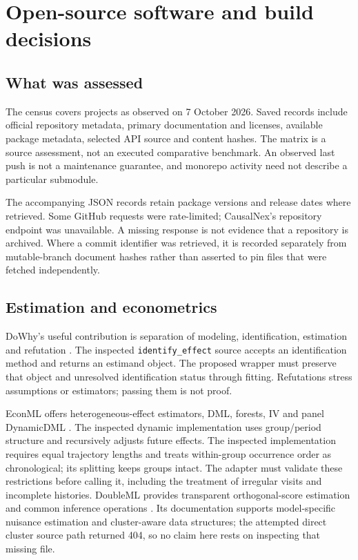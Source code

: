 \chapter{Open-source software and build decisions}\label{ch:software}
\section{What was assessed}
The census covers \SoftwareCount{} projects as observed on 7 October 2026. Saved records
include official repository metadata, primary documentation and licenses,
available package metadata, selected API source and content hashes.
The matrix is a source assessment, not an executed comparative benchmark.
An observed last push is not a maintenance guarantee, and monorepo activity
need not describe a particular submodule.

The accompanying JSON records retain package versions and release dates
where retrieved. Some GitHub requests were rate-limited; CausalNex's
repository endpoint was unavailable. A missing response is not evidence
that a repository is archived. Where a commit identifier was retrieved,
it is recorded separately from mutable-branch document hashes rather than
asserted to pin files that were fetched independently.

\section{Estimation and econometrics}
DoWhy's useful contribution is separation of modeling, identification,
estimation and refutation \citep{dowhy2020,sw_dowhy}.
The inspected \texttt{identify\_effect} source accepts an identification
method and returns an estimand object. The proposed wrapper must preserve
that object and unresolved identification status through fitting.
Refutations stress assumptions or estimators; passing them is not proof.

EconML offers heterogeneous-effect estimators, DML, forests, IV and
panel DynamicDML \citep{sw_econml}. The inspected dynamic implementation
uses group/period structure and recursively adjusts future effects.
The inspected implementation requires equal trajectory lengths and treats
within-group occurrence order as chronological; its splitting keeps groups
intact. The adapter must validate these restrictions before calling it,
including the treatment of irregular visits and incomplete histories.
DoubleML provides transparent orthogonal-score estimation and common
inference operations \citep{doubleml2022,sw_doubleml}. Its documentation
supports model-specific nuisance estimation and cluster-aware data structures;
the attempted direct cluster source path returned 404, so no claim here
rests on inspecting that missing file.

